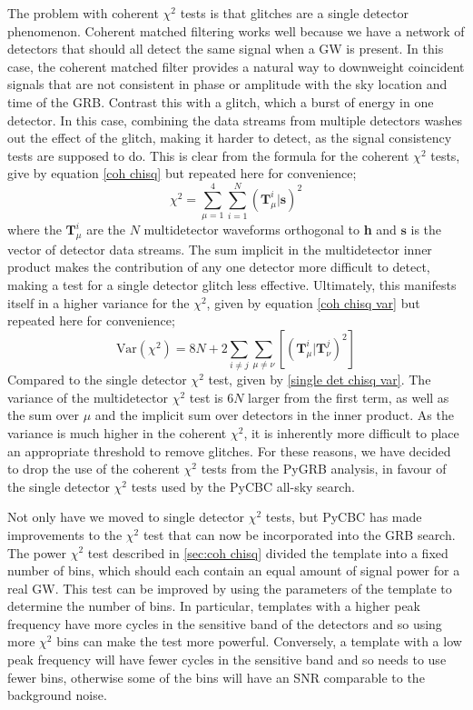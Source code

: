 \documentclass[11pt]{cuthesis}
\begin{document}
The problem with coherent $\chi^2$ tests is that glitches are a single detector phenomenon. Coherent matched filtering works well because we have a network of detectors that should all detect the same signal when a GW is present. In this case, the coherent matched filter provides a natural way to downweight coincident signals that are not consistent in phase or amplitude with the sky location and time of the GRB. Contrast this with a glitch, which a burst of energy in one detector. In this case, combining the data streams from multiple detectors washes out the effect of the glitch, making it harder to detect, as the signal consistency tests are supposed to do. This is clear from the formula for the coherent $\chi^2$ tests, give by equation \ref{coh chisq} but repeated here for convenience;
\begin{equation}
\chi^2 = \sum_{\mu=1}^4 \sum_{i=1}^N (\textbf{T}^i_\mu | \textbf{s})^2 
\end{equation}
where the $\textbf{T}^i_\mu$ are the $N$ multidetector waveforms orthogonal to \textbf{h} and $\textbf{s}$ is the vector of detector data streams.
The sum implicit in the multidetector inner product makes the contribution of any one detector more difficult to detect, making a test for a single detector glitch less effective. Ultimately, this manifests itself in a higher variance for the $\chi^2$, given by equation \ref{coh chisq var} but repeated here for convenience; 
\begin{equation}
\text{Var}(\chi^2) = 8N + 2\sum_{i \neq j} \sum_{\mu\neq\nu} [(\textbf{T}^i_\mu | \textbf{T}^j_\nu)^2 ] 
\end{equation}
Compared to the single detector $\chi^2$ test, given by \ref{single det chisq var}. The variance of the multidetector $\chi^2$ test is $6N$ larger from the first term, as well as the sum over $\mu$ and the implicit sum over detectors in the inner product. As the variance is much higher in the coherent $\chi^2$, it is inherently more difficult to place an appropriate threshold to remove glitches. For these reasons, we have decided to drop the use of the coherent $\chi^2$ tests from the PyGRB analysis, in favour of the single detector $\chi^2$ tests used by the PyCBC all-sky search.

Not only have we moved to single detector $\chi^2$ tests, but PyCBC has made improvements to the $\chi^2$ test that can now be incorporated into the GRB search. The power $\chi^2$ test described in \ref{sec:coh chisq} divided the template into a fixed number of bins, which should each contain an equal amount of signal power for a real GW. This test can be improved by using the parameters of the template to determine the number of bins. In particular, templates with a higher peak frequency have more cycles in the sensitive band of the detectors and so using more $\chi^2$ bins can make the test more powerful. Conversely, a template with a low peak frequency will have fewer cycles in the sensitive band and so needs to use fewer bins, otherwise some of the bins will have an SNR comparable to the background noise. 
\end{document}

